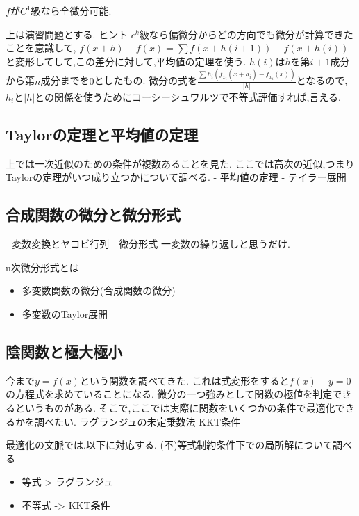\begin{prop}
 $f$が$C^1$級なら全微分可能.
\end{prop}
上は演習問題とする.
ヒント
$c^k$級なら偏微分からどの方向でも微分が計算できたことを意識して,
$f(x+h)-f(x) = \sum f(x + h(i+1)) -f(x +h(i))$と変形してして,この差分に対して,平均値の定理を使う.
$h(i)$は$h$を第$i+1$成分から第$n$成分までを$0$としたもの.
微分の式を$\frac{\sum h_i (f_{x_i}(x + \tilde{h}_i) - f_{x_i}(x))}{|h|}$となるので,
$h_i$と$|h|$との関係を使うためにコーシーシュワルツで不等式評価すれば,言える.

\subsection{Taylorの定理と平均値の定理}
上では一次近似のための条件が複数あることを見た.
ここでは高次の近似,つまりTaylorの定理がいつ成り立つかについて調べる.
- 平均値の定理
- テイラー展開


\subsection{合成関数の微分と微分形式}

- 変数変換とヤコビ行列
- 微分形式
  一変数の繰り返しと思うだけ.

n次微分形式とは


\begin{exs}
  \begin{itemize}
    \item 多変数関数の微分(合成関数の微分)
    \item 多変数のTaylor展開
  \end{itemize}
\end{exs}


\subsection{陰関数と極大極小}
今まで$y=f(x)$という関数を調べてきた.
これは式変形をすると$f(x)-y =0$の方程式を求めていることになる.
微分の一つ強みとして関数の極値を判定できるというものがある.
そこで,ここでは実際に関数をいくつかの条件で最適化できるかを調べたい.
ラグランジュの未定乗数法
KKT条件

\begin{rem}
 最適化の文脈では.以下に対応する.
 (不)等式制約条件下での局所解について調べる
\begin{itemize}
  \item 等式-> ラグランジュ
  \item 不等式 -> KKT条件
\end{itemize}
\end{rem}

